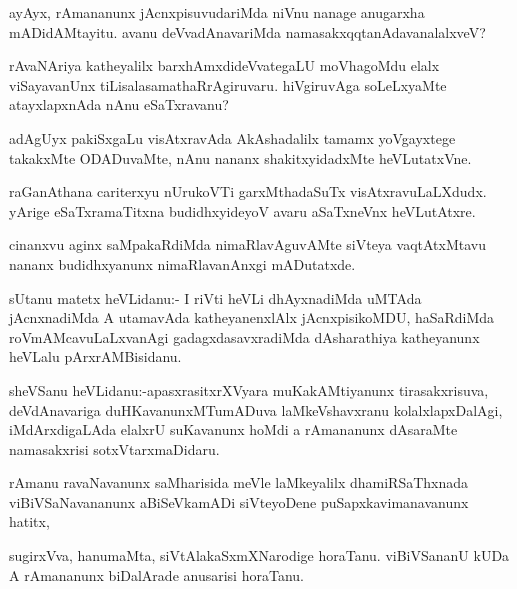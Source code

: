 \documentclass{article}
\begin{document}
\begin{mn}%
ayAyx, rAmananunx jAcnxpisuvudariMda niVnu nanage anugarxha mADidAMtayitu. avanu 
deVvadAnavariMda namasakxqqtanAdavanalalxveV?
\end{mn}

\begin{mn}%
rAvaNAriya katheyalilx barxhAmxdideVvategaLU moVhagoMdu elalx 
viSayavanUnx tiLisalasamathaRrAgiruvaru. hiVgiruvAga soLeLxyaMte atayxlapxnAda 
nAnu eSaTxravanu?
\end{mn}

\begin{mn}%
adAgUyx pakiSxgaLu visAtxravAda AkAshadalilx tamamx yoVgayxtege takakxMte 
ODADuvaMte, nAnu nananx shakitxyidadxMte heVLutatxVne.
\end{mn}

\begin{mn}%
raGanAthana cariterxyu nUrukoVTi garxMthadaSuTx visAtxravuLaLXdudx. yArige 
eSaTxramaTitxna budidhxyideyoV avaru aSaTxneVnx heVLutAtxre.
\end{mn}

\begin{mn}%
cinanxvu aginx saMpakaRdiMda nimaRlavAguvAMte siVteya vaqtAtxMtavu nananx 
budidhxyanunx nimaRlavanAnxgi mADutatxde.
\end{mn}

\begin{mn}%
sUtanu matetx heVLidanu:- I  riVti heVLi dhAyxnadiMda uMTAda jAcnxnadiMda A 
utamavAda katheyanenxlAlx jAcnxpisikoMDU, haSaRdiMda roVmAMcavuLaLxvanAgi 
gadagxdasavxradiMda dAsharathiya katheyanunx heVLalu pArxrAMBisidanu.
\end{mn}

\begin{mn}%
sheVSanu heVLidanu:-apasxrasitxrXVyara muKakAMtiyanunx tirasakxrisuva, 
deVdAnavariga duHKavanunxMTumADuva laMkeVshavxranu kolalxlapxDalAgi, 
iMdArxdigaLAda elalxrU suKavanunx hoMdi a rAmananunx dAsaraMte namasakxrisi 
sotxVtarxmaDidaru.
\end{mn}

\begin{mn}%
rAmanu ravaNavanunx saMharisida meVle laMkeyalilx dhamiRSaThxnada viBiVSaNavananunx
aBiSeVkamADi siVteyoDene puSapxkavimanavanunx hatitx,
\end{mn}

\begin{mn}%
sugirxVva, hanumaMta, siVtAlakaSxmXNarodige horaTanu. viBiVSananU kUDa A 
rAmananunx biDalArade anusarisi horaTanu.
\end{mn}
\end{document}
